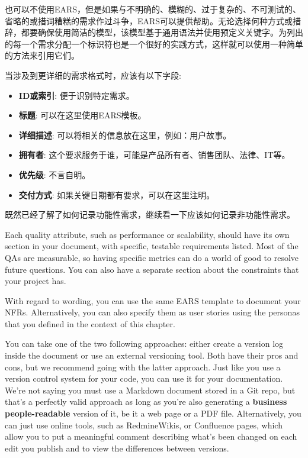 也可以不使用EARS，但是如果与不明确的、模糊的、过于复杂的、不可测试的、省略的或措词糟糕的需求作过斗争，EARS可以提供帮助。无论选择何种方式或措辞，都要确保使用简洁的模型，该模型基于通用语法并使用预定义关键字。为列出的每一个需求分配一个标识符也是一个很好的实践方式，这样就可以使用一种简单的方法来引用它们。

当涉及到更详细的需求格式时，应该有以下字段:

\begin{itemize}
\item 
\textbf{ID或索引}: 便于识别特定需求。

\item 
\textbf{标题}: 可以在这里使用EARS模板。

\item 
\textbf{详细描述}: 可以将相关的信息放在这里，例如：用户故事。

\item
\textbf{拥有者}: 这个要求服务于谁，可能是产品所有者、销售团队、法律、IT等。

\item
\textbf{优先级}: 不言自明。

\item
\textbf{交付方式}: 如果关键日期都有要求，可以在这里注明。
\end{itemize}

既然已经了解了如何记录功能性需求，继续看一下应该如何记录非功能性需求。


Each quality attribute, such as performance or scalability, should have its own section in your document, with specific, testable requirements listed. Most of the QAs are measurable, so having specific metrics can do a world of good to resolve future questions. You can also have a separate section about the constraints that your project has.

With regard to wording, you can use the same EARS template to document your NFRs. Alternatively, you can also specify them as user stories using the personas that you defined in the context of this chapter.


You can take one of the two following approaches: either create a version log inside the document or use an external versioning tool. Both have their pros and cons, but we recommend going with the latter approach. Just like you use a version control system for your code, you can use it for your documentation. We're not saying you must use a Markdown document stored in a Git repo, but that's a perfectly valid approach as long as you're also generating a \textbf{business people-readable} version of it, be it a web page or a PDF file. Alternatively, you can just use online tools, such as RedmineWikis, or Confluence pages, which allow you to put a meaningful comment describing what's been changed on each edit you publish and to view the differences between versions.

